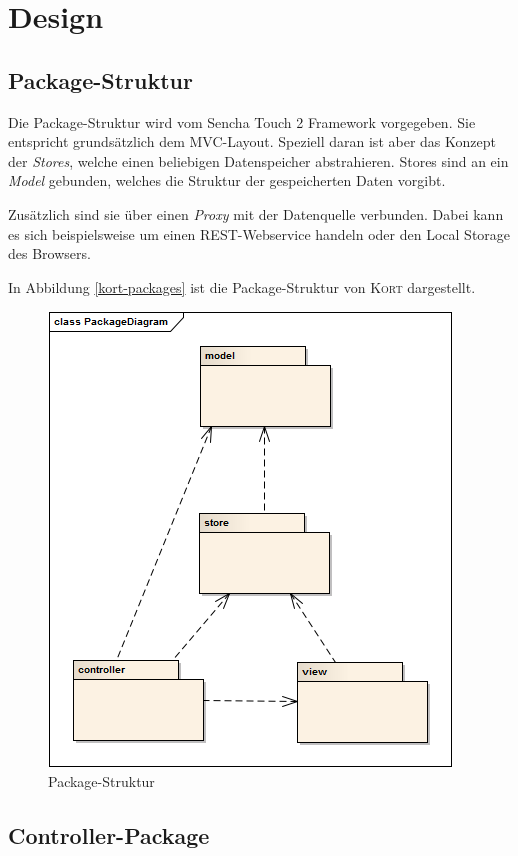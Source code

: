 \section{Design}

\subsection{Package-Struktur}

Die Package-Struktur wird vom Sencha Touch 2 Framework vorgegeben. Sie entspricht grundsätzlich dem MVC-Layout.
Speziell daran ist aber das Konzept der \emph{Stores}, welche einen beliebigen Datenspeicher abstrahieren.
Stores sind an ein \emph{Model} gebunden, welches die Struktur der gespeicherten Daten vorgibt.

Zusätzlich sind sie über einen \emph{Proxy} mit der Datenquelle verbunden.
Dabei kann es sich beispielsweise um einen \gls{REST}-Webservice handeln oder den \gls{Local Storage} des Browsers.

In Abbildung \ref{kort-packages} ist die Package-Struktur von \textsc{Kort} dargestellt.

\begin{figure}[H]
	\centering
	\includegraphics[scale=0.7]{images/uml/kort-packagediagram}
	\caption{Package-Struktur}
	\label{image-kort-packagediagram}
\end{figure}

\subsection{Controller-Package}

